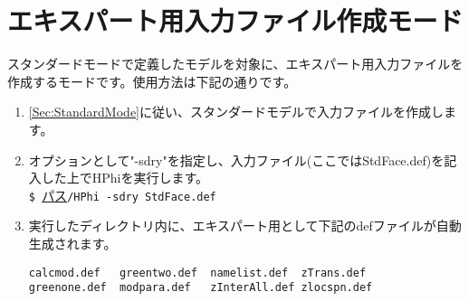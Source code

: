 \section{エキスパート用入力ファイル作成モード}
スタンダードモードで定義したモデルを対象に、エキスパート用入力ファイルを作成するモードです。使用方法は下記の通りです。
\begin{enumerate}
\item{\ref{Sec:StandardMode}に従い、スタンダードモデルで入力ファイルを作成します。}
\item{オプションとして"-sdry"を指定し、入力ファイル(ここではStdFace.def)を記入した上でHPhiを実行します。}\\
\verb|$ |\underline{パス}\verb|/HPhi -sdry StdFace.def|
~\\
\item{実行したディレクトリ内に、エキスパート用として下記のdefファイルが自動生成されます。}\\
\begin{minipage}{12cm}
\begin{screen}
\begin{verbatim}
calcmod.def   greentwo.def  namelist.def  zTrans.def
greenone.def  modpara.def   zInterAll.def zlocspn.def
\end{verbatim}
\end{screen}
\end{minipage}
\end{enumerate}
